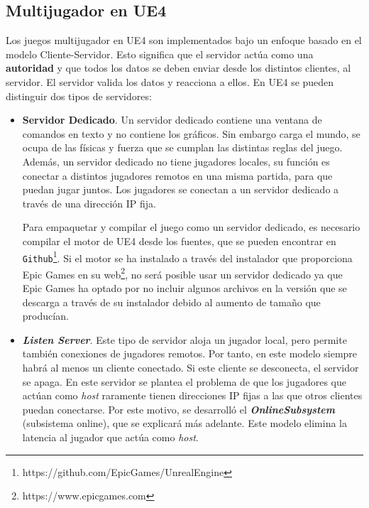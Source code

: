 \subsection{Multijugador en \acf{UE4}}

Los juegos multijugador en \ac{UE4} son implementados bajo un enfoque basado en el modelo Cliente-Servidor. Esto significa que el servidor actúa como una \textbf{autoridad} y que todos los datos se deben enviar desde los distintos clientes, al servidor. El servidor valida los datos y reacciona a ellos. En \ac{UE4} se pueden distinguir dos tipos de servidores:

\begin{itemize}
\item \textbf{Servidor Dedicado}. Un servidor dedicado contiene una ventana de comandos en texto y no contiene los gráficos. Sin embargo carga el mundo, se ocupa de las físicas y fuerza que se cumplan las distintas reglas del juego. Además, un servidor dedicado no tiene jugadores locales, su función es conectar a distintos jugadores remotos en una misma partida, para que puedan jugar juntos. Los jugadores se conectan a un servidor dedicado a través de una dirección IP fija.

Para empaquetar y compilar el juego como un servidor dedicado, es necesario compilar el motor de \ac{UE4} desde los fuentes, que se pueden encontrar en \texttt{Github}\footnote{https://github.com/EpicGames/UnrealEngine}. Si el motor se ha instalado a través del instalador que proporciona Epic Games en su web\footnote{https://www.epicgames.com}, no será posible usar un servidor dedicado ya que Epic Games ha optado por no incluir algunos archivos en la versión que se descarga a través de su instalador debido al aumento de tamaño que producían. 

\item \textbf{\textit{Listen Server}}. Este tipo de servidor aloja un jugador local, pero permite también conexiones de jugadores remotos. Por tanto, en este modelo siempre habrá al menos un cliente conectado. Si este cliente se desconecta, el servidor se apaga. En este servidor se plantea el problema de que los jugadores que actúan como \textit{host} raramente tienen direcciones IP fijas a las que otros clientes puedan conectarse. Por este motivo, se desarrolló el \textbf{\textit{OnlineSubsystem}} (subsistema online), que se explicará más adelante. Este modelo elimina la latencia al jugador que actúa como \textit{host}.
\end{itemize}

